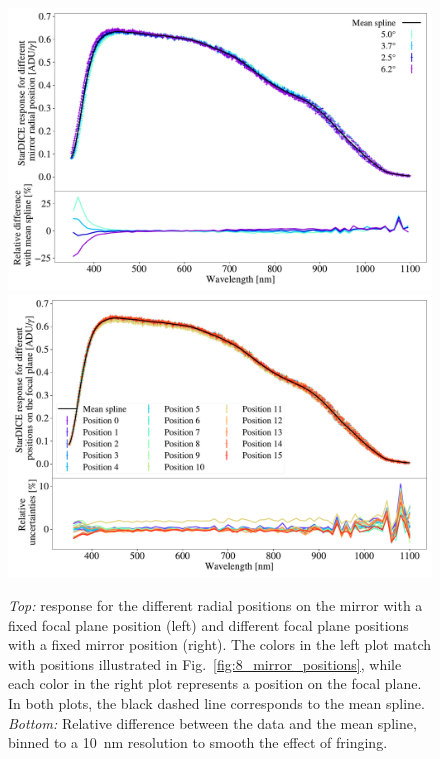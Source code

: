 \begin{figure}[h!]
    \centering
    \includegraphics[width=\columnwidth]{fig/radial_positions.pdf}
    \includegraphics[width=\columnwidth]{fig/ccd_positions.pdf}
    \caption{\textit{Top:} \SD response for the different radial positions on the mirror with a fixed focal plane position (left) and different focal plane positions with a fixed mirror position (right). The colors in the left plot match with positions illustrated in Fig.~\ref{fig:8_mirror_positions}, while each color in the right plot represents a position on the focal plane. In both plots, the black dashed line corresponds to the mean spline. \textit{Bottom:} Relative difference between the data and the mean spline, binned to a \SI{10}{\nano\meter} resolution to smooth the effect of fringing.}
    \label{fig:radial_positions}
\end{figure}

